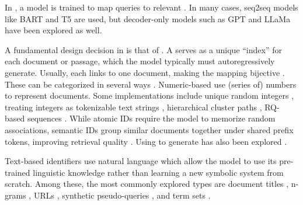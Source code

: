 In , a model is trained to map queries to relevant . In many cases, seq2seq models like BART \cite{lewis-bart-denoising} and T5 \cite{colin-raffel-exploring-the} are used, but decoder-only models such as GPT \cite{alec-radford-improving-language} and LLaMa \cite{aaron-grattafiori-the-llama} have been explored as well.


A fundamental design decision in  is that of . A  serves as a unique ``index'' for each document or passage, which the model typically must autoregressively generate. Usually, each  links to one document, making the mapping bijective \cite{xiaoxi-li-from-matching}. 
These can be categorized in several ways \cite{xiaoxi-li-from-matching}. Numeric-based  use (series of) numbers to represent documents. Some implementations include unique random integers \cite{yi-tay-transformer-memory}, treating integers as tokenizable text strings \cite{yi-tay-transformer-memory}, hierarchical cluster paths \cite{weiwei-sun-learning-to}, RQ\cite{chen-approximate-nearest}-based  sequences \cite{hansi-zeng-scalable-and}. While atomic IDs require the model to memorize random associations, semantic IDs group similar documents together under shared prefix tokens, improving retrieval quality \cite{ronak-pradeep-how-does}. Using  to generate  has also been explored \cite{weiwei-sun-learning-to,hansi-zeng-scalable-and}.

Text-based identifiers use natural language  which allow the model to use its pre-trained linguistic knowledge rather than learning a new symbolic system from scratch. Among these, the most commonly explored types are document titles \cite{nicola-de-cao-autoregressive-entity,chen-corpusbrain-pretrain,chen-gere-generative,yujia-zhou-ultron-an}, n-grams \cite{michele-bevilacqua-autoregressive-search,yongqi-li-multiview-identifiers,yongqi-li-learning-to,li-distillation-enhanced}, URLs \cite{ziems-large-language,yujia-zhou-ultron-an}, synthetic pseudo-queries \cite{yongqi-li-multiview-identifiers,yongqi-li-learning-to,li-distillation-enhanced,yujing-wang-a-neural,shengyao-zhuang-bridging-the}, and term sets \cite{peitian-zhang-generative-retrieval,hansi-zeng-planning-ahead}.

